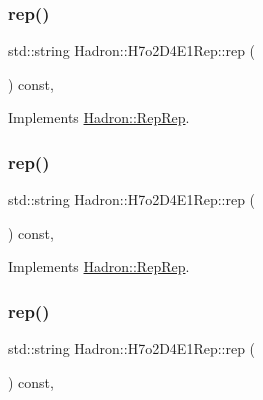 \subsubsection{\texorpdfstring{rep()}{rep()}\hspace{0.1cm}{\footnotesize\ttfamily [1/3]}}
{\footnotesize\ttfamily std\+::string Hadron\+::\+H7o2\+D4\+E1\+Rep\+::rep (\begin{DoxyParamCaption}{ }\end{DoxyParamCaption}) const\hspace{0.3cm}{\ttfamily [inline]}, {\ttfamily [virtual]}}



Implements \mbox{\hyperlink{structHadron_1_1RepRep_ab3213025f6de249f7095892109575fde}{Hadron\+::\+Rep\+Rep}}.

\mbox{\label{structHadron_1_1H7o2D4E1Rep_ae6cc5dc38275bfce35b58694bc85cfe1}} 
\subsubsection{\texorpdfstring{rep()}{rep()}\hspace{0.1cm}{\footnotesize\ttfamily [2/3]}}
{\footnotesize\ttfamily std\+::string Hadron\+::\+H7o2\+D4\+E1\+Rep\+::rep (\begin{DoxyParamCaption}{ }\end{DoxyParamCaption}) const\hspace{0.3cm}{\ttfamily [inline]}, {\ttfamily [virtual]}}



Implements \mbox{\hyperlink{structHadron_1_1RepRep_ab3213025f6de249f7095892109575fde}{Hadron\+::\+Rep\+Rep}}.

\mbox{\label{structHadron_1_1H7o2D4E1Rep_ae6cc5dc38275bfce35b58694bc85cfe1}} 
\subsubsection{\texorpdfstring{rep()}{rep()}\hspace{0.1cm}{\footnotesize\ttfamily [3/3]}}
{\footnotesize\ttfamily std\+::string Hadron\+::\+H7o2\+D4\+E1\+Rep\+::rep (\begin{DoxyParamCaption}{ }\end{DoxyParamCaption}) const\hspace{0.3cm}{\ttfamily [inline]}, {\ttfamily [virtual]}}



